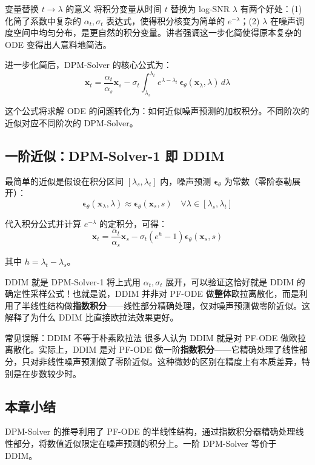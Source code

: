\begin{knowledgebox}{变量替换 $t \to \lambda$ 的意义}
将积分变量从时间 $t$ 替换为 log-SNR $\lambda$ 有两个好处：(1) 化简了系数中复杂的 $\alpha_t, \sigma_t$ 表达式，使得积分核变为简单的 $e^{-\lambda}$；(2) $\lambda$ 在噪声调度空间中均匀分布，是更自然的积分变量。讲者强调这一步化简使得原本复杂的 ODE 变得出人意料地简洁。
\end{knowledgebox}

进一步化简后，DPM-Solver 的核心公式为：
$$\mathbf{x}_t = \frac{\alpha_t}{\alpha_s} \mathbf{x}_s - \sigma_t \int_{\lambda_s}^{\lambda_t} e^{\lambda - \lambda_t}\, \boldsymbol{\epsilon}_\theta(\mathbf{x}_\lambda, \lambda)\, d\lambda$$

这个公式将求解 ODE 的问题转化为：如何近似噪声预测的加权积分。不同阶次的近似对应不同阶次的 DPM-Solver。

\subsection{一阶近似：DPM-Solver-1 即 DDIM}

最简单的近似是假设在积分区间 $[\lambda_s, \lambda_t]$ 内，噪声预测 $\boldsymbol{\epsilon}_\theta$ 为常数（零阶泰勒展开）：
$$\boldsymbol{\epsilon}_\theta(\mathbf{x}_\lambda, \lambda) \approx \boldsymbol{\epsilon}_\theta(\mathbf{x}_s, s) \quad \forall \lambda \in [\lambda_s, \lambda_t]$$

代入积分公式并计算 $e^{-\lambda}$ 的定积分，可得：
$$\mathbf{x}_t = \frac{\alpha_t}{\alpha_s} \mathbf{x}_s - \sigma_t (e^{h} - 1) \boldsymbol{\epsilon}_\theta(\mathbf{x}_s, s)$$

其中 $h = \lambda_t - \lambda_s$。

\begin{importantbox}{DDIM 就是 DPM-Solver-1}
将上式用 $\alpha_t, \sigma_t$ 展开，可以验证这恰好就是 DDIM 的确定性采样公式！也就是说，DDIM 并非对 PF-ODE 做\textbf{整体}欧拉离散化，而是利用了半线性结构做\textbf{指数积分}——线性部分精确处理，仅对噪声预测做零阶近似。这解释了为什么 DDIM 比直接欧拉法效果更好。
\end{importantbox}

\begin{warningbox}{常见误解：DDIM 不等于朴素欧拉法}
很多人认为 DDIM 就是对 PF-ODE 做欧拉离散化。实际上，DDIM 是对 PF-ODE 做一阶\textbf{指数积分}——它精确处理了线性部分，只对非线性噪声预测做了零阶近似。这种微妙的区别在精度上有本质差异，特别是在步数较少时。
\end{warningbox}

\subsection{本章小结}

DPM-Solver 的推导利用了 PF-ODE 的半线性结构，通过指数积分器精确处理线性部分，将数值近似限定在噪声预测的积分上。一阶 DPM-Solver 等价于 DDIM。


